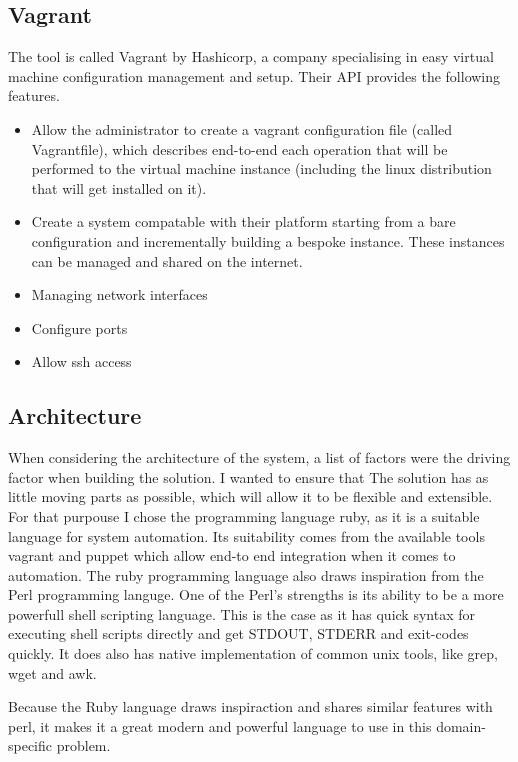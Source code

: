 \documentclass{article}
\begin{document}
\subsection{Vagrant}
The tool is called Vagrant by Hashicorp, a company specialising in easy virtual machine configuration management and setup. Their API provides the following features.

	\begin{itemize}
		\item
			Allow the administrator to create a vagrant configuration file (called Vagrantfile), which describes end-to-end each operation that will be performed to the virtual machine instance (including the linux distribution that will get installed on it).
		\item
			Create a system compatable with their platform starting from a bare configuration and incrementally building a bespoke instance. These instances can be managed and shared on the internet.
		\item
			Managing network interfaces
		\item
			Configure ports
		\item 
			Allow \gls{ssh} access
	\end{itemize}

\subsection{Architecture}
When considering the architecture of the system, a list of factors were the driving factor when building the solution. I wanted to ensure that The solution has as little moving parts as possible, which will allow it to be flexible and extensible. For that purpouse I chose the programming language ruby, as it is a suitable language for system automation. Its suitability comes from the available tools vagrant and puppet which allow end-to end integration when it comes to automation. The ruby programming language also draws inspiration from the Perl programming languge. One of the Perl's strengths is its ability to be a more powerfull shell scripting language. This is the case as it has quick syntax for executing shell scripts directly and get STDOUT, STDERR and exit-codes quickly. It does also has native implementation of common unix tools, like grep, wget and awk.

Because the Ruby language draws inspiraction and shares similar features with perl, it makes it a great modern and powerful language to use in this domain-specific problem.
\end{document}
